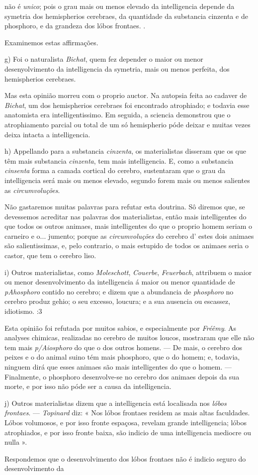 não é \emph{unico}; pois o grau mais ou menos elevado da intelligencia depende da symetria dos hemispherios cerebraes, da quantidade da substancia cinzenta e de phosphoro, e da grandeza dos lóbos frontaes. .\par Examinemos estas affirmações.\par g) Foi o naturalista \emph{Bichat}, quem fez depender o maior ou menor desenyolvimento da intelligencia da symetria, mais ou menos perfeita, dos hemispherios cerebraes.\par Mas esta opinião morreu com o proprio auctor. Na autopsia feita ao cadaver de \emph{Bichat}, um dos hemispherios cerebraes foi encontrado atrophiado; e todavia esse anatomista era intelligentissimo. Em seguida, a sciencia demonstrou que o atrophiamento parcial ou total de um só hemispherio póde deixar e muitas vezes deixa intacta a intelligencia.\par h) Appellando para a substancia \emph{cinzenta}, os materialistas disseram que os que têm mais substancia \emph{cinzenta}, tem mais intelligencia. E, como a substancia \emph{cinsenta} forma a camada cortical do cerebro, sustentaram que o grau da intelligencia será mais ou menos elevado, segundo forem mais ou menos salientes as \emph{circumvoluções}.\par Não gastaremos muitas palavras para refutar esta doutrina. Sô diremos que, se devessemos acreditar nas palavras dos materialistas, então mais intelligentes do que todos os outros animaes, mais intelligentes do que o proprio homem seriam o carneiro e o... jumento; porque as \emph{circumvoluções} do cerebro d' estes dois animaes são salientissimas, e, pelo contrario, o mais estupido de todos os animaes seria o castor, que tem o cerebro liso.\par i) Outros materialistas, como \emph{Moleschott}, \emph{Couerbe}, \emph{Feuerbach}, attribuem o maior ou menor desenvolvimento da intelligencia á maior ou menor quantidade de \emph{pAhosphoro} contido no cerebro; e dizem que a abundancia de \emph{phosphoro} no cerebro produz gehio; o seu excesso, loucura; e a sua ausencia ou escassez, idiotismo. :3\par Esta opinião foi refutada por muitos sabios, e especialmente por \emph{Fréêmy}. As analyses chimicas, realizadas no cerebro de muitos loucos, mostraram que elle não tem mais \emph{p/Aiosphoro} do que o dos outros homens. --- De mais, o cerebro dos peixes e o do animal suino tém mais phosphoro, que o do homem; e, todavia, ninguem dirá que esses animaes são mais intelligentes do que o homem. --- Finalmente, o phosphoro desenvolve-se no cerebro dos animaes depois da sua morte, e por isso não póde ser a causa da intelligencia.\par j) Outros materialistas dizem que a intelligencia está localisada nos \emph{lóbos frontaes}. --- \emph{Topinard} diz: « Nos lóbos frontaes residem as mais altas faculdades. Lóbos volumosos, e por isso fronte espaçosa, revelam grande intelligencia; lóbos atrophiados, e por isso fronte baixa, são indicio de uma intelligencia mediocre ou nulla ».\par Respondemos que o desenvolvimento dos lóbos frontaes não é indicio seguro do desenvolvimento da 